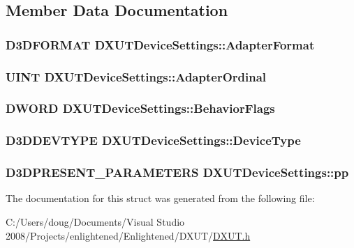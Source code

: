 \subsection{Member Data Documentation}
\hypertarget{struct_d_x_u_t_device_settings_a78f577a8d78ad427fac4f833bc1c1bb4}{
\subsubsection[{AdapterFormat}]{\setlength{\rightskip}{0pt plus 5cm}D3DFORMAT {\bf DXUTDeviceSettings::AdapterFormat}}}
\label{struct_d_x_u_t_device_settings_a78f577a8d78ad427fac4f833bc1c1bb4}
\hypertarget{struct_d_x_u_t_device_settings_ac00ec64bb226ee683c4e3554a6835933}{
\subsubsection[{AdapterOrdinal}]{\setlength{\rightskip}{0pt plus 5cm}UINT {\bf DXUTDeviceSettings::AdapterOrdinal}}}
\label{struct_d_x_u_t_device_settings_ac00ec64bb226ee683c4e3554a6835933}
\hypertarget{struct_d_x_u_t_device_settings_a69d3a37b13d31c063036c25d893f7def}{
\subsubsection[{BehaviorFlags}]{\setlength{\rightskip}{0pt plus 5cm}DWORD {\bf DXUTDeviceSettings::BehaviorFlags}}}
\label{struct_d_x_u_t_device_settings_a69d3a37b13d31c063036c25d893f7def}
\hypertarget{struct_d_x_u_t_device_settings_a9dc10f7cf1c3de20e74b137972c38247}{
\subsubsection[{DeviceType}]{\setlength{\rightskip}{0pt plus 5cm}D3DDEVTYPE {\bf DXUTDeviceSettings::DeviceType}}}
\label{struct_d_x_u_t_device_settings_a9dc10f7cf1c3de20e74b137972c38247}
\hypertarget{struct_d_x_u_t_device_settings_acb5b0e659eeb53c48323cb23bc057240}{
\subsubsection[{pp}]{\setlength{\rightskip}{0pt plus 5cm}D3DPRESENT\_\-PARAMETERS {\bf DXUTDeviceSettings::pp}}}
\label{struct_d_x_u_t_device_settings_acb5b0e659eeb53c48323cb23bc057240}


The documentation for this struct was generated from the following file:\begin{DoxyCompactItemize}
\item 
C:/Users/doug/Documents/Visual Studio 2008/Projects/enlightened/Enlightened/DXUT/\hyperlink{_d_x_u_t_8h}{DXUT.h}\end{DoxyCompactItemize}
